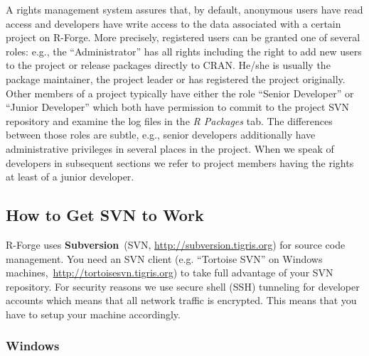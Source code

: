 \documentclass[a4paper]{article}
\newcommand{\tab}[1]{{\normalfont\textit{#1}}}
\newcommand{\proglang}[1]{\textsf{#1}}
\begin{document}
A rights management system assures that, by default, anonymous users
have read access and developers have write access to the data associated with 
a certain project on \proglang{R}-Forge. More precisely, registered users can
be granted one of several roles: e.g., the ``Administrator'' has
all rights including the right to 
add new users to the project or release packages directly to CRAN.
He/she is usually the package 
maintainer, the project leader or has registered the project originally.
Other members of a project typically have either the role ``Senior 
Developer'' or ``Junior Developer'' which both have permission to
commit to the project SVN repository and examine the log files in the 
\tab{R Packages} tab. The differences between those
roles are subtle, e.g., senior developers additionally have administrative
privileges in several places in the project.  
When we speak of developers in subsequent sections we refer to project
members having the rights at least of a junior developer.


\subsection{How to Get SVN to Work}
\label{sec:scmhowto}

\proglang{R}-Forge uses \textbf{Subversion}~(SVN,
\url{http://subversion.tigris.org}) for source code management.
You need an SVN client (e.g. ``Tortoise SVN'' on
Windows machines,~\url{http://tortoisesvn.tigris.org}) to take full
advantage of your SVN repository. For security
reasons we use secure shell (SSH) tunneling for
developer accounts which means that all network traffic is
encrypted. This means that you have to setup your machine
accordingly.

\subsubsection{Windows}
\end{document}
